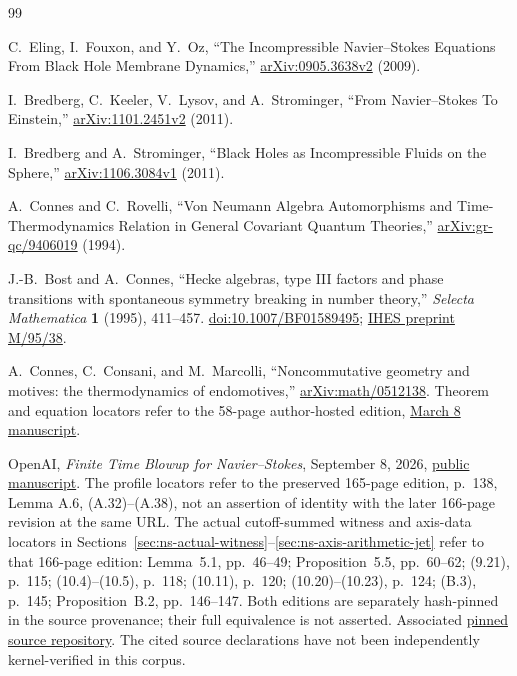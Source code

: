 \begin{thebibliography}{99}

C.~Eling, I.~Fouxon, and Y.~Oz,
``The Incompressible Navier--Stokes Equations From Black Hole Membrane Dynamics,''
\href{https://arxiv.org/abs/0905.3638v2}{arXiv:0905.3638v2} (2009).

I.~Bredberg, C.~Keeler, V.~Lysov, and A.~Strominger,
``From Navier--Stokes To Einstein,''
\href{https://arxiv.org/abs/1101.2451v2}{arXiv:1101.2451v2} (2011).

I.~Bredberg and A.~Strominger,
``Black Holes as Incompressible Fluids on the Sphere,''
\href{https://arxiv.org/abs/1106.3084v1}{arXiv:1106.3084v1} (2011).

A.~Connes and C.~Rovelli,
``Von Neumann Algebra Automorphisms and Time-Thermodynamics Relation
in General Covariant Quantum Theories,''
\href{https://arxiv.org/abs/gr-qc/9406019}{arXiv:gr-qc/9406019} (1994).

J.-B.~Bost and A.~Connes,
``Hecke algebras, type III factors and phase transitions with spontaneous
symmetry breaking in number theory,''
\emph{Selecta Mathematica} \textbf{1} (1995), 411--457.
\href{https://doi.org/10.1007/BF01589495}{doi:10.1007/BF01589495};
\href{https://repo-archives.ihes.fr/FONDS_IHES/I_Prepublications/CONNES/1994-1998/M_95_38/M_95_38_web.pdf}{IHES preprint M/95/38}.

A.~Connes, C.~Consani, and M.~Marcolli,
``Noncommutative geometry and motives: the thermodynamics of endomotives,''
\href{https://arxiv.org/abs/math/0512138}{arXiv:math/0512138}.
Theorem and equation locators refer to the 58-page author-hosted edition,
\href{https://www.math.fsu.edu/~marcolli/ncgandmotivesMarch8.pdf}{March 8 manuscript}.

OpenAI,
\emph{Finite Time Blowup for Navier--Stokes}, September 8, 2026,
\href{https://cdn.openai.com/pdf/32d9f210-8b73-45e0-91bc-82a30aef8a9a/navier-stokes.pdf}{public manuscript}.
The profile locators refer to the preserved 165-page edition, p.~138,
Lemma A.6, (A.32)--(A.38), not an assertion of identity with the later
166-page revision at the same URL.
The actual cutoff-summed witness and axis-data locators in
Sections~\ref{sec:ns-actual-witness}--\ref{sec:ns-axis-arithmetic-jet}
refer to that 166-page edition: Lemma~5.1, pp.~46--49;
Proposition~5.5, pp.~60--62; (9.21), p.~115;
(10.4)--(10.5), p.~118; (10.11), p.~120;
(10.20)--(10.23), p.~124; (B.3), p.~145;
Proposition~B.2, pp.~146--147. Both editions are separately
hash-pinned in the source provenance; their full equivalence is not asserted.
Associated
\href{https://github.com/openai/NavierStokesAndEuler/tree/8937a8f4cbc7abaab5e9e97d1cc7f5d2319d9538}{pinned source repository}.
The cited source declarations have not been independently kernel-verified
in this corpus.


\end{thebibliography}
